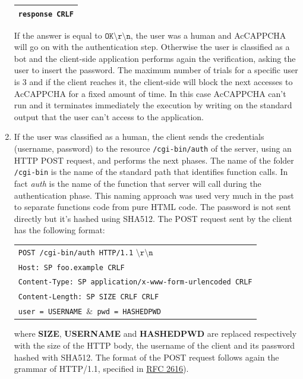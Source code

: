 \begin{enumerate}
{\begin{table}[H]
\begin{tabular}{|c|}
\hline
\texttt{response CRLF}\\
\hline
\end{tabular}
\end{table}
If the answer is equal to $\mathtt{OK\setminus r\setminus n}$, the user was a human and AcCAPPCHA will go on with the authentication step. Otherwise the user is classified as a bot and the client-side application performs again the verification, asking the user to insert the password. The maximum number of trials for a specific user is 3 and if the client reaches it, the client-side will block the next accesses to AcCAPPCHA for a fixed amount of time. In this case AcCAPPCHA can't run and it terminates immediately the execution by writing on the standard output that the user can't access to the application.}
\item{If the user was classified as a human, the client sends the credentials (username, password) to the resource \texttt{/cgi-bin/auth} of the server, using an HTTP POST request, and performs the next phases. The name of the folder \texttt{/cgi-bin} is the name of the standard path that identifies function calls. In fact \textit{auth} is the name of the function that server will call during the authentication phase. This naming approach was used very much in the past to separate functions code from pure HTML code. The password is not sent directly but it's hashed using SHA512. The POST request sent by the client has the following format:\\
\begin{table}[H]
\hspace{2cm}\centering\footnotesize
\begin{tabular}{|l|}
\hline
\texttt{POST /cgi-bin/auth HTTP/1.1} $\mathtt{\setminus r\setminus n}$\\
\texttt{Host: SP foo.example CRLF}\\
\texttt{Content-Type: SP application/x-www-form-urlencoded CRLF}\\
\texttt{Content-Length: SP SIZE CRLF CRLF}\\
\texttt{user = USERNAME $\mathtt{\&}$ pwd = HASHEDPWD}\\
\hline
\end{tabular}
\end{table}
where \textbf{SIZE}, \textbf{USERNAME} and \textbf{HASHEDPWD} are replaced respectively with the size of the HTTP body, the username of the client and its password hashed with SHA512. The format of the POST request follows again the grammar of HTTP/1.1, specified in \href{https://tools.ietf.org/html/rfc2616}{RFC 2616}).
}
\end{enumerate}
